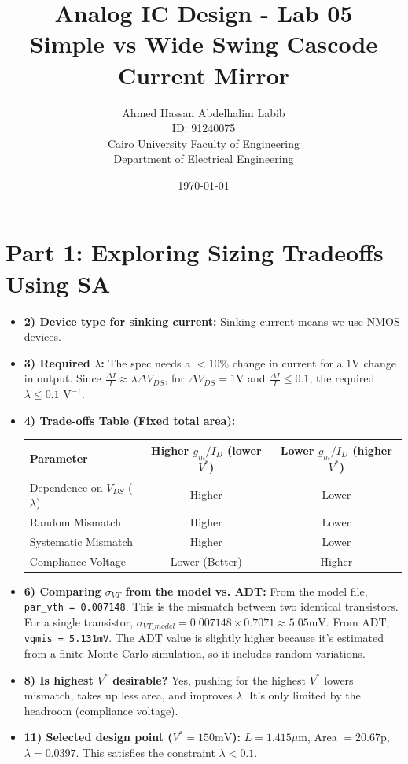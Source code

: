 \documentclass[12pt,a4paper]{article}
\title{Analog IC Design - Lab 05\\Simple vs Wide Swing Cascode Current Mirror}
\author{Ahmed Hassan Abdelhalim Labib \\ ID: 91240075 \\ Cairo University Faculty of Engineering \\ Department of Electrical Engineering}
\date{\today}
\begin{document}
\maketitle

\section*{Part 1: Exploring Sizing Tradeoffs Using SA}
\begin{itemize}
    \item \textbf{2) Device type for sinking current:} Sinking current means we use NMOS devices.
    \item \textbf{3) Required $\lambda$:} The spec needs a $< 10\%$ change in current for a $1\text{V}$ change in output. Since $\frac{\Delta I}{I} \approx \lambda \Delta V_{DS}$, for $\Delta V_{DS} = 1\text{V}$ and $\frac{\Delta I}{I} \le 0.1$, the required $\lambda \le 0.1 \text{ V}^{-1}$.
    \item \textbf{4) Trade-offs Table (Fixed total area):}
    \begin{table}[h!]
        \centering
        \begin{tabular}{lcc}
            \toprule
            \textbf{Parameter} & \textbf{Higher $g_m/I_D$ (lower $V^*$)} & \textbf{Lower $g_m/I_D$ (higher $V^*$)} \\
            \midrule
            Dependence on $V_{DS}$ ($\lambda$) & Higher & Lower \\
            Random Mismatch & Higher & Lower \\
            Systematic Mismatch & Higher & Lower \\
            Compliance Voltage & Lower (Better) & Higher \\
            \bottomrule
        \end{tabular}
    \end{table}
    \item \textbf{6) Comparing $\sigma_{VT}$ from the model vs. ADT:}
    From the model file, \texttt{par\_vth = 0.007148}. This is the mismatch between two identical transistors. For a single transistor, $\sigma_{VT\_model} = 0.007148 \times 0.7071 \approx 5.05\text{mV}$.
    From ADT, \texttt{vgmis = 5.131mV}. The ADT value is slightly higher because it's estimated from a finite Monte Carlo simulation, so it includes random variations.
    \item \textbf{8) Is highest $V^*$ desirable?} Yes, pushing for the highest $V^*$ lowers mismatch, takes up less area, and improves $\lambda$. It's only limited by the headroom (compliance voltage).
    \item \textbf{11) Selected design point ($V^* = 150\text{mV}$):} $L = 1.415\mu\text{m}$, Area $= 20.67\text{p}$, $\lambda = 0.0397$. This satisfies the constraint $\lambda < 0.1$.
\end{itemize}
\end{document}
